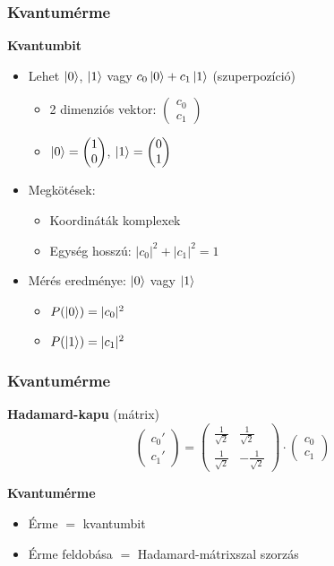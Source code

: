 \documentclass[aspectratio=169]{beamer}
\begin{document}
\begin{frame}
  \frametitle{Kvantumérme}
  \textbf{Kvantumbit}
  \begin{itemize}
    \item Lehet $\ket{0}$, $\ket{1}$ vagy $c_0\ket{0} + c_1\ket{1}$ (szuperpozíció)
          \begin{itemize}
            \item 2 dimenziós vektor: $\begin{pmatrix} c_0 \\ c_1 \end{pmatrix}$
            \item $\ket{0} = \begin{pmatrix} 1 \\ 0\end{pmatrix}$, $\ket{1} = \begin{pmatrix} 0 \\ 1\end{pmatrix}$
          \end{itemize}
          \pause
    \item Megkötések:
          \begin{itemize}
            \item Koordináták komplexek
            \item Egység hosszú: $|c_0|^2 + |c_1|^2 = 1$
          \end{itemize}
          \pause
    \item Mérés eredménye: $\ket{0}$ vagy $\ket{1}$
          \begin{itemize}
            \item $P(\ket{0}) = |c_0|^2$
            \item $P(\ket{1}) = |c_1|^2$
          \end{itemize}
  \end{itemize}
\end{frame}

\begin{frame}
  \frametitle{Kvantumérme}

  \textbf{Hadamard-kapu} (mátrix)
  \[\begin{pmatrix} c_0' \\ c_1'
    \end{pmatrix} = \begin{pmatrix} \frac{1}{\sqrt{2}} & \frac{1}{\sqrt{2}}
      \\ \frac{1}{\sqrt{2}} & -\frac{1}{\sqrt{2}}\end{pmatrix} \cdot
    \begin{pmatrix} c_0 \\ c_1 \end{pmatrix}\]

  \pause
  \textbf{Kvantumérme}\\
  \begin{itemize}
    \item Érme $=$ kvantumbit
    \item Érme feldobása $=$ Hadamard-mátrixszal szorzás
  \end{itemize}
\end{frame}
\end{document}
